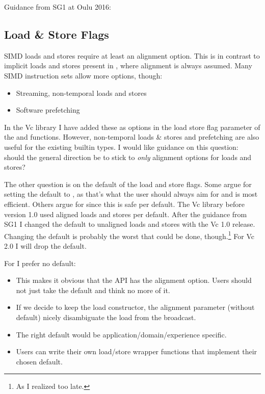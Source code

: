 Guidance from SG1 at Oulu 2016:\\

\subsection{Load \& Store Flags}\label{sec:flags}
SIMD loads and stores require at least an alignment option.
This is in contrast to implicit loads and stores present in \CC{}, where alignment is always assumed.
Many SIMD instruction sets allow more options, though:
\begin{itemize}
  \item Streaming, non-temporal loads and stores
  \item Software prefetching
\end{itemize}
In the Vc library I have added these as options in the load store flag parameter of the  and  functions.
However, non-temporal loads \& stores and prefetching are also useful for the existing builtin types.
I would like guidance on this question: should the general direction be to stick to \emph{only} alignment options for \simd loads and stores?

The other question is on the default of the load and store flags.
Some argue for setting the default to , as that's what the user should always aim for and is most efficient.
Others argue for  since this is safe per default.
The Vc library before version 1.0 used aligned loads and stores per default.
After the guidance from SG1 I changed the default to unaligned loads and stores with the Vc 1.0 release.
Changing the default is probably the worst that could be done, though.\footnote{As I realized too late.}
For Vc 2.0 I will drop the default.

For \simd I prefer no default:
\begin{itemize}
  \item This makes it obvious that the API has the alignment option.
    Users should not just take the default and think no more of it.
  \item If we decide to keep the load constructor, the alignment parameter (without default) nicely disambiguate the load from the broadcast.
  \item The right default would be application/domain/experience specific.
  \item Users can write their own load/store wrapper functions that implement their chosen default.
\end{itemize}

